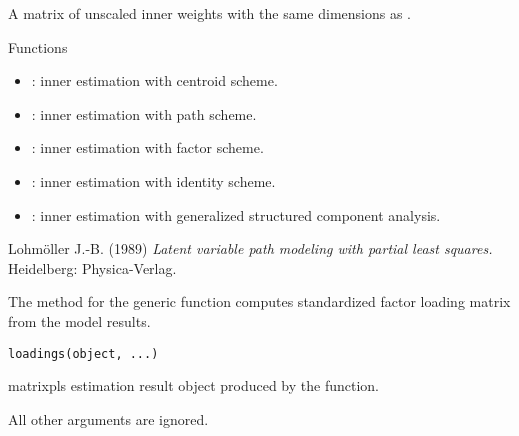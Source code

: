 \documentclass[a4paper]{book}
\begin{document}
%
\begin{Value}
A matrix of unscaled inner weights  with the same dimensions as .
\end{Value}
%
\begin{Section}{Functions}
\begin{itemize}

\item{} : inner estimation with centroid scheme.

\item{} : inner estimation with path scheme.

\item{} : inner estimation with factor scheme.

\item{} : inner estimation with identity scheme.

\item{} : inner estimation with generalized structured component analysis.

\end{itemize}
\end{Section}
%
\begin{References}\relax
Lohmöller J.-B. (1989) \emph{Latent variable path modeling with partial least squares.} Heidelberg: Physica-Verlag.
\end{References}
%
\begin{Description}\relax
The  method for the generic function  computes standardized factor loading matrix
from the model results.
\end{Description}
%
\begin{Usage}
\begin{verbatim}
loadings(object, ...)
\end{verbatim}
\end{Usage}
%
\begin{Arguments}
\begin{ldescription}
\item[\code{object}] matrixpls estimation result object produced by the  function.

\item[\code{...}] All other arguments are ignored.
\end{ldescription}
\end{Arguments}
\end{document}
